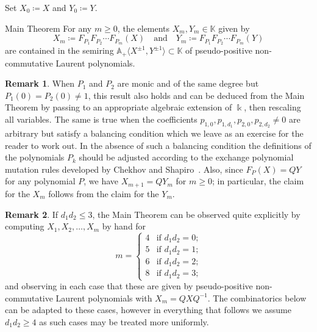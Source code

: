 \documentclass[10pt]{amsart}
\theoremstyle{definition}
\newtheorem*{rema*}{Remark}
\newenvironment{enonce*}[2][]{\par\smallskip\noindent\textbf{#2}.\par\nobreak}{\par\smallskip}
\newcommand{\kk}{\Bbbk}
\renewcommand{\AA}{\mathbb{A}}
\newcommand{\KK}{\mathbb{K}}
\newenvironment{introremark}{\begin{rema*}}{\end{rema*}}
\newenvironment{maintheorem}{\begin{enonce*}{Main Theorem}}{\end{enonce*}}
\begin{document}
 Set $X_0\coloneqq X$ and $Y_0\coloneqq Y$.
 \begin{maintheorem}
 \label{th:main}
 For any $m\ge0$, the elements $ X_m, Y_m\in\KK$ given by
 \begin{equation}
 \label{eq:non-commutative initial cluster mutation}
 X_m\coloneqq F_{P_1}F_{P_2}\cdots F_{P_m}(X)\quad\text{and}\quad Y_m\coloneqq F_{P_1}F_{P_2}\cdots F_{P_m}(Y)
 \end{equation}
 are contained in the semiring $\AA_+\langle X^{\pm1},Y^{\pm1}\rangle\subset\KK$ of pseudo-positive non-commutative Laurent polynomials.
 \end{maintheorem}
 \begin{introremark}
 When $P_1$ and $P_2$ are monic and of the same degree but $P_1(0)=P_2(0)\ne1$, this result also holds and can be deduced from the Main Theorem by passing to an appropriate algebraic extension of $\kk$, then rescaling all variables. 
 The same is true when the coefficients $p_{1,0},p_{1,d_1},p_{2,0},p_{2,d_2}\ne0$ are arbitrary but satisfy a balancing condition which we leave as an exercise for the reader to work out. 
 In the absence of such a balancing condition the definitions of the polynomials $P_k$ should be adjusted according to the exchange polynomial mutation rules developed by Chekhov and Shapiro~\cite{chekhov-shapiro}.
 Also, since $F_P(X)=QY$ for any polynomial $P$, we have $X_{m+1}=QY_m$ for $m\ge0$; in particular, the claim for the $X_m$ follows from the claim for the $Y_m$.
 \end{introremark}
 \begin{introremark}
 If $d_1d_2\le3$, the Main Theorem can be observed quite explicitly by computing $X_1,X_2,\ldots,X_m$ by hand for 
 \[
 m=\begin{cases} 4 & \text{if $d_1d_2=0$;}\\ 5 & \text{if $d_1d_2=1$;}\\ 6 & \text{if $d_1d_2=2$;}\\ 8 & \text{if $d_1d_2=3$;}\end{cases}
 \]
 and observing in each case that these are given by pseudo-positive non-commutative Laurent polynomials with $X_m=QXQ^{-1}$.
 The combinatorics below can be adapted to these cases, however in everything that follows we assume $d_1d_2\ge4$ as such cases may be treated more uniformly.
 \end{introremark}
\end{document}
